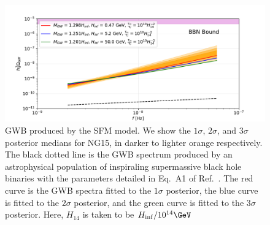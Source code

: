 \onecolumngrid
\begin{figure}
\includegraphics[width=\textwidth]{fig/fig8.pdf} 
\caption{GWB produced by the SFM model. We show the $1\sigma$, $2\sigma$, and $3\sigma$ posterior medians for NG15, in darker to lighter orange respectively. The black dotted line is the GWB spectrum produced by an astrophysical population of inspiraling supermassive black hole binaries with the parameters detailed in Eq.\ A1 of Ref.\ \cite{Afzal:2023}. The red curve is the GWB spectra fitted to the $1\sigma$ posterior, the blue curve is fitted to the $2\sigma$ posterior, and the green curve is fitted to the $3\sigma$ posterior. Here, $H_{14}$ is taken to be $H_{\inf} / 10^{14} \GeV$}
\label{fig:GWB}
\end{figure}
\twocolumngrid


